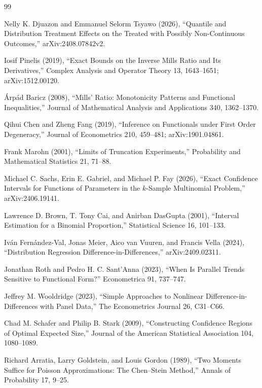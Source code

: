 \documentclass{article}
\begin{document}
\begin{thebibliography}{99}

   Nelly K. Djuazon and Emmanuel Selorm Tsyawo (2026), ``Quantile and Distribution Treatment Effects on the Treated with Possibly Non-Continuous Outcomes,'' arXiv:2408.07842v2.

   Iosif Pinelis (2019), ``Exact Bounds on the Inverse Mills Ratio and Its Derivatives,'' Complex Analysis and Operator Theory 13, 1643--1651; arXiv:1512.00120.

   Árpád Baricz (2008), ``Mills' Ratio: Monotonicity Patterns and Functional Inequalities,'' Journal of Mathematical Analysis and Applications 340, 1362--1370.

   Qihui Chen and Zheng Fang (2019), ``Inference on Functionals under First Order Degeneracy,'' Journal of Econometrics 210, 459--481; arXiv:1901.04861.

   Frank Marohn (2001), ``Limits of Truncation Experiments,'' Probability and Mathematical Statistics 21, 71--88.

   Michael C. Sachs, Erin E. Gabriel, and Michael P. Fay (2026), ``Exact Confidence Intervals for Functions of Parameters in the \(k\)-Sample Multinomial Problem,'' arXiv:2406.19141.

   Lawrence D. Brown, T. Tony Cai, and Anirban DasGupta (2001), ``Interval Estimation for a Binomial Proportion,'' Statistical Science 16, 101--133.

   Iván Fernández-Val, Jonas Meier, Aico van Vuuren, and Francis Vella (2024), ``Distribution Regression Difference-in-Differences,'' arXiv:2409.02311.

   Jonathan Roth and Pedro H. C. Sant'Anna (2023), ``When Is Parallel Trends Sensitive to Functional Form?'' Econometrica 91, 737--747.

   Jeffrey M. Wooldridge (2023), ``Simple Approaches to Nonlinear Difference-in-Differences with Panel Data,'' The Econometrics Journal 26, C31--C66.

   Chad M. Schafer and Philip B. Stark (2009), ``Constructing Confidence Regions of Optimal Expected Size,'' Journal of the American Statistical Association 104, 1080--1089.

   Richard Arratia, Larry Goldstein, and Louis Gordon (1989), ``Two Moments Suffice for Poisson Approximations: The Chen--Stein Method,'' Annals of Probability 17, 9--25.

\end{thebibliography}
\end{document}

